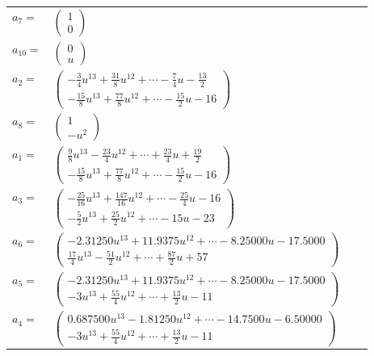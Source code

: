 \documentclass[1p]{elsarticle_modified}
\theoremstyle{definition}
\begin{document}
\begin{tabular}{m{7pt} m{180pt} m{7pt} m{180pt} }
\flushright $a_{7}=$&$\begin{pmatrix}1\\0\end{pmatrix}$ \\
\flushright $a_{10}=$&$\begin{pmatrix}0\\u\end{pmatrix}$ \\
\flushright $a_{2}=$&$\begin{pmatrix}-\frac{3}{4} u^{13}+\frac{31}{8} u^{12}+\cdots-\frac{7}{4} u-\frac{13}{2}\\-\frac{15}{8} u^{13}+\frac{77}{8} u^{12}+\cdots-\frac{15}{2} u-16\end{pmatrix}$ \\
\flushright $a_{8}=$&$\begin{pmatrix}1\\- u^2\end{pmatrix}$ \\
\flushright $a_{1}=$&$\begin{pmatrix}\frac{9}{8} u^{13}-\frac{23}{4} u^{12}+\cdots+\frac{23}{4} u+\frac{19}{2}\\-\frac{15}{8} u^{13}+\frac{77}{8} u^{12}+\cdots-\frac{15}{2} u-16\end{pmatrix}$ \\
\flushright $a_{3}=$&$\begin{pmatrix}-\frac{25}{16} u^{13}+\frac{147}{16} u^{12}+\cdots-\frac{25}{4} u-16\\-\frac{5}{2} u^{13}+\frac{25}{2} u^{12}+\cdots-15 u-23\end{pmatrix}$ \\
\flushright $a_{6}=$&$\begin{pmatrix}-2.31250 u^{13}+11.9375 u^{12}+\cdots-8.25000 u-17.5000\\\frac{17}{4} u^{13}-\frac{51}{2} u^{12}+\cdots+\frac{87}{2} u+57\end{pmatrix}$ \\
\flushright $a_{5}=$&$\begin{pmatrix}-2.31250 u^{13}+11.9375 u^{12}+\cdots-8.25000 u-17.5000\\-3 u^{13}+\frac{55}{4} u^{12}+\cdots+\frac{13}{2} u-11\end{pmatrix}$ \\
\flushright $a_{4}=$&$\begin{pmatrix}0.687500 u^{13}-1.81250 u^{12}+\cdots-14.7500 u-6.50000\\-3 u^{13}+\frac{55}{4} u^{12}+\cdots+\frac{13}{2} u-11\end{pmatrix}$ \\

\end{tabular}
\end{document}
